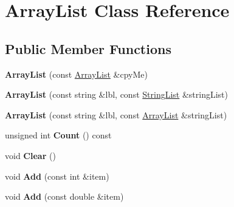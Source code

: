 \hypertarget{classrrc_1_1_array_list}{\section{Array\-List Class Reference}
\label{classrrc_1_1_array_list}
}
\subsection*{Public Member Functions}
\begin{DoxyCompactItemize}
\item 
\hypertarget{classrrc_1_1_array_list_acbb05e3198514df15229385925cf40a3}{{\bfseries Array\-List} (const \hyperlink{classrrc_1_1_array_list}{Array\-List} \&cpy\-Me)}\label{classrrc_1_1_array_list_acbb05e3198514df15229385925cf40a3}

\item 
\hypertarget{classrrc_1_1_array_list_a028aea1c545af53946615c4d5ddba7ca}{{\bfseries Array\-List} (const string \&lbl, const \hyperlink{classrrc_1_1_string_list}{String\-List} \&string\-List)}\label{classrrc_1_1_array_list_a028aea1c545af53946615c4d5ddba7ca}

\item 
\hypertarget{classrrc_1_1_array_list_a9c595e9d42b6a4d4e62404c11ef52839}{{\bfseries Array\-List} (const string \&lbl, const \hyperlink{classrrc_1_1_array_list}{Array\-List} \&string\-List)}\label{classrrc_1_1_array_list_a9c595e9d42b6a4d4e62404c11ef52839}

\item 
\hypertarget{classrrc_1_1_array_list_a074f9905a87bb9395d21d9f4bc8c459f}{unsigned int {\bfseries Count} () const }\label{classrrc_1_1_array_list_a074f9905a87bb9395d21d9f4bc8c459f}

\item 
\hypertarget{classrrc_1_1_array_list_aa71d36872f416feaa853788a7a7a7ef8}{void {\bfseries Clear} ()}\label{classrrc_1_1_array_list_aa71d36872f416feaa853788a7a7a7ef8}

\item 
\hypertarget{classrrc_1_1_array_list_a17caac96dcd8cceab22322f020519706}{void {\bfseries Add} (const int \&item)}\label{classrrc_1_1_array_list_a17caac96dcd8cceab22322f020519706}

\item 
\hypertarget{classrrc_1_1_array_list_a5c371a159c312404e83375094cd64e89}{void {\bfseries Add} (const double \&item)}\label{classrrc_1_1_array_list_a5c371a159c312404e83375094cd64e89}


\end{DoxyCompactItemize}
